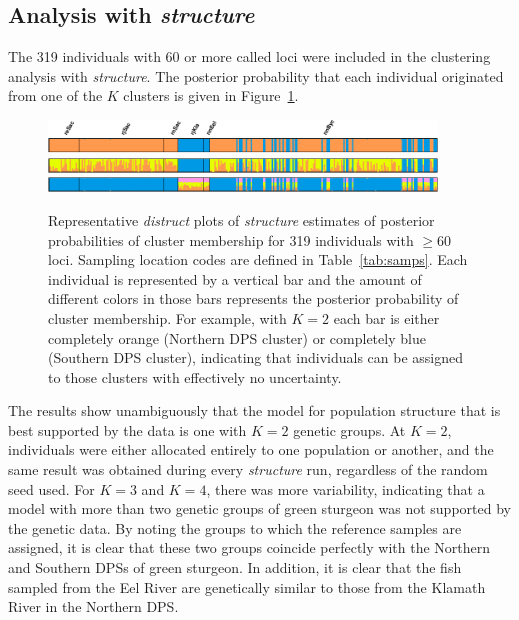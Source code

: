 \documentclass[twocolumn,natbib]{svjour3}       %
\begin{document}
\subsection{Analysis with {\em structure}}
The 319 individuals with 60 or more called loci were included in the clustering analysis with {\em structure}. 
The posterior probability that each 
individual originated from one of the $K$ clusters is given in Figure~\ref{fig:distruct}. 
\begin{figure}
\includegraphics[width = 0.92\textwidth]{BB_ds_Clumped_TopLabel_k002r001.pdf}~ \\
\includegraphics[width = 0.92\textwidth]{BB_ds_Clumped_NoLabel_k003r001.pdf}~ \\
\includegraphics[width = 0.92\textwidth]{BB_ds_Clumped_NoLabel_k004r001.pdf}~
\caption{ Representative {\em distruct} \protect\citep{rosenberg2004distruct} plots of {\em structure} estimates 
of posterior probabilities of cluster membership for 319 individuals with $\geq 60$ loci. Sampling location 
codes are defined in Table~\ref{tab:samps}. Each individual is represented by a vertical bar and the amount of different colors in those
bars represents the posterior probability of cluster membership. For example, with $K=2$ each bar is either completely orange (Northern 
DPS cluster) or completely blue (Southern DPS cluster), indicating that individuals can be assigned to those clusters with effectively 
no uncertainty. \label{fig:distruct}}
\end{figure}
The results show unambiguously that the model for population structure that is best supported by the 
data is one with $K = 2$ genetic groups. At $K=2$, individuals were either allocated entirely to
one population or another, and the same result was obtained during every {\em structure} run,
regardless of the random seed used. For $K=3$ and $K=4$, there was more variability, 
indicating that a model with more than two genetic groups of green sturgeon 
was not supported by the genetic data. By noting the groups to which the reference samples are assigned, it is clear 
that these two groups coincide perfectly with the Northern and Southern DPSs of green sturgeon. In addition, it is 
clear that the fish sampled from the Eel River are genetically similar to those from the Klamath River in the Northern DPS.
\end{document}
